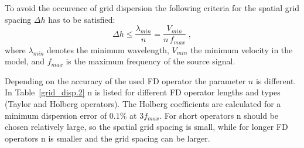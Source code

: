 To avoid the occurence of grid dispersion the following criteria for the spatial grid spacing $\Delta h$ has to be satisfied:
\begin{equation}
    \Delta h \le \frac{\lambda_{min}}{n} = \frac{V_{min}}{{n}\,f_{max}}\;,
    \label{eq:dh}
\end{equation}
where $\lambda_{min}$ denotes the minimum wavelength, $V_{min}$ the minimum velocity in the model, and $f_{max}$ is the maximum frequency of the source signal.  

Depending on the accuracy of the used FD operator the parameter $n$ is different. In Table~\ref{grid_disp.2} n is listed for different FD operator lengths and types (Taylor and Holberg operators). The Holberg coefficients are calculated for a minimum dispersion error of $0.1\%$ at $3 f_{max}$. For short operators n should be chosen relatively large, so the spatial grid spacing is small, while for longer FD operators n is smaller and the grid spacing can be larger. 
